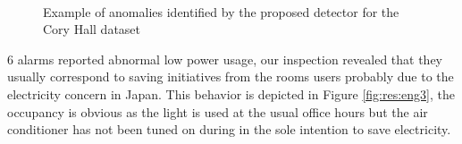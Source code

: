 \begin{figure}[t]
   \hspace{.015\textwidth}
 \hspace{.015\textwidth}
 \\ 
\caption{Example of anomalies identified by the proposed detector for the Cory Hall dataset}
\end{figure}

6 alarms reported abnormal low power usage, our inspection revealed that they usually correspond to saving initiatives from the rooms users probably due to the electricity concern in Japan.
This behavior is depicted in Figure \ref{fig:res:eng3}, the occupancy is obvious as the light is used at the usual office hours but the air conditioner has not been tuned on during in the sole intention to save electricity.

